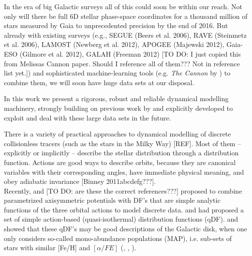 In the era of big Galactic surveys all of this could soon be within our reach. Not only will there be full 6D stellar phase-space coordinates for a thousand million of stars measured by Gaia to unprecedented precision by the end of 2016. But already with existing surveys (e.g., SEGUE (Beers et al. 2006), RAVE (Steinmetz et al. 2006), LAMOST (Newberg et al. 2012), APOGEE (Majewski 2012), Gaia-ESO (Gilmore et al. 2012), GALAH (Freeman 2012) [TO DO: I just copied this from Melissas Cannon paper. Should I reference all of them??? Not in reference list yet.]) and sophisticated machine-learning tools (e.g. \emph{The Cannon} by \cite{nes15}) to combine them, we will soon have huge data sets at our disposal.

In this work we present a rigorous, robust and reliable dynamical modelling machinery, strongly building on previous work by \cite{bin11,bin12,bov13,bov15} and explicitly developed to exploit and deal with these large data sets in the future.

There is a variety of practical approaches to dynamical modelling of discrete collisionless tracers (such as the stars in the Milky Way) [REF]. Most of them -- explicitly or implicitly -- describe the stellar distribution through a distribution function.  Actions are good ways to describe orbits, because they are canonical variables with their corresponding angles, have immediate physical meaning, and obey adiabatic invariance [Binney 2011abcdefg???]. \\

Recently, \cite{bin12b} and \cite{bov13} [TO DO: are these the correct references???] proposed to combine parametrized axisymmetric potentials with DF's that are simple analytic functions of the three orbital actions to model discrete data. \cite{bin10} and \cite{bin11} had proposed a set of simple action-based (quasi-isothermal) distribution functions (qDF). \cite{Tin13} and \cite{bov13} showed that these qDF's may be good descriptions of the Galactic disk, when one only considers so-called mono-abundance populations (MAP), i.e. sub-sets of stars with similar [Fe/H] and $[\alpha/FE]$ (\cite{bov12b}, \cite{bov12c}, \cite{bov12d}). \\

